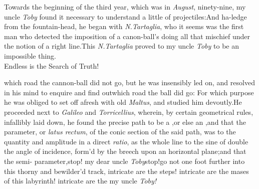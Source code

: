 \documentclass{article}
\begin{document}
Towards the beginning of the third year, which was in
\textit{August}, ninety-nine, my uncle \textit{Toby} found it necessary
to understand a little of projectiles:\tsk And ha-\break{}\break ledge from the fountain-head, he began with
\textit{N.\@ Tartaglia}, who it seems was the first man who detected
the imposition of a canon-ball’s doing all that mischief
under the notion of a right line.\tsk This\break
\textit{N.\@ Tartaglia} proved to my uncle \textit{Toby} to be an
impossible thing.\\
\newpage
\tsh Endless is the Search of Truth!

\noindent
{}
which road the
cannon-ball did not go, but he was insensibly led on, and resolv\-ed
in his mind to enquire and find out\break which road the ball did go: For
which purpose he was obliged to set off afresh with old
\textit{Maltus}, and studied him devout\-ly.\tsk He proceeded next to
\textit{Galileo} and \textit{Torricellius}, wherein, by certain
geometrical rules, infallibly laid down, he found the precise path
to be a ,\tsk or else an
,\tsk and that the parameter, or \textit{latus
rectum}, of the conic section of the said path, was to the
quantity and amplitude in a direct \textit{ratio}, as the whole line
to the sine of double the angle of incidence, form’d by the breech
upon an horizontal plane;\tsk and that the
semi- parameter,\tsh stop! my dear uncle
\textit{Toby}\tsh stop!\tsk go not one foot further\break 
into this thorny and bewilder’d track,\tsk\break
intricate are the steps!  intricate are the\break
mases of this labyrinth! intricate are the\break
{}
my uncle \textit{Toby!}

\newpage
\null
\end{document}
